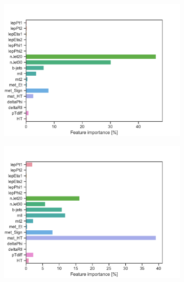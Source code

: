 \begin{figure}[H]
\begin{subfigure}[t!]{0.49\textwidth}
        \includegraphics[width = \textwidth]{Figures/WW/BDT/All_level/Low/featureImportance.pdf}
        \caption{}
        \label{fig:featWWLow}
    \end{subfigure}
    \begin{subfigure}[t!]{0.49\textwidth}
        \includegraphics[width = \textwidth]{Figures/Mono_Z/ML/BDT/All_level/Low/featureImportance.pdf}
        \caption{}
        \label{fig:featMonoZLow}
    \end{subfigure}
    \caption{}
    \label{fig:resExample}
\end{figure}

